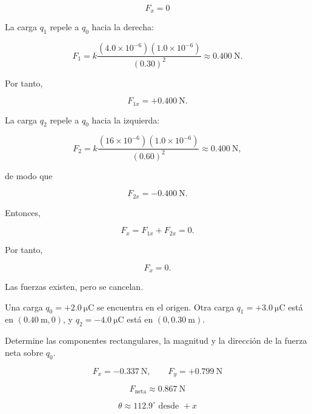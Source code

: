 \begin{respuesta}
\[
\boxed{F_x=0}
\]
\end{respuesta}

\begin{explicacion}
La carga \(q_1\) repele a \(q_0\) hacia la derecha:

\[
F_1=k\frac{(4.0\times10^{-6})(1.0\times10^{-6})}{(0.30)^2}
\approx\SI{0.400}{\newton}.
\]

Por tanto,

\[
F_{1x}=+\SI{0.400}{\newton}.
\]

La carga \(q_2\) repele a \(q_0\) hacia la izquierda:

\[
F_2=k\frac{(16\times10^{-6})(1.0\times10^{-6})}{(0.60)^2}
\approx\SI{0.400}{\newton},
\]

de modo que

\[
F_{2x}=-\SI{0.400}{\newton}.
\]

Entonces,

\[
F_x=F_{1x}+F_{2x}=0.
\]

Por tanto,

\[
\boxed{F_x=0}.
\]

Las fuerzas existen, pero se cancelan.
\end{explicacion}


\begin{ejercicio}
Una carga \(q_0=+\SI{2.0}{\micro\coulomb}\) se encuentra en el origen.
Otra carga \(q_1=+\SI{3.0}{\micro\coulomb}\) está en
\((\SI{0.40}{\metre},0)\), y \(q_2=-\SI{4.0}{\micro\coulomb}\) está en
\((0,\SI{0.30}{\metre})\).

Determine las componentes rectangulares, la magnitud y la dirección de la
fuerza neta sobre \(q_0\).
\end{ejercicio}

\begin{respuesta}
\[
\boxed{F_x=-\SI{0.337}{\newton}}, \qquad
\boxed{F_y=+\SI{0.799}{\newton}}
\]

\[
\boxed{F_{\text{neta}}\approx\SI{0.867}{\newton}}
\]

\[
\boxed{\theta\approx112.9^\circ\text{ desde }+x}
\]
\end{respuesta}


